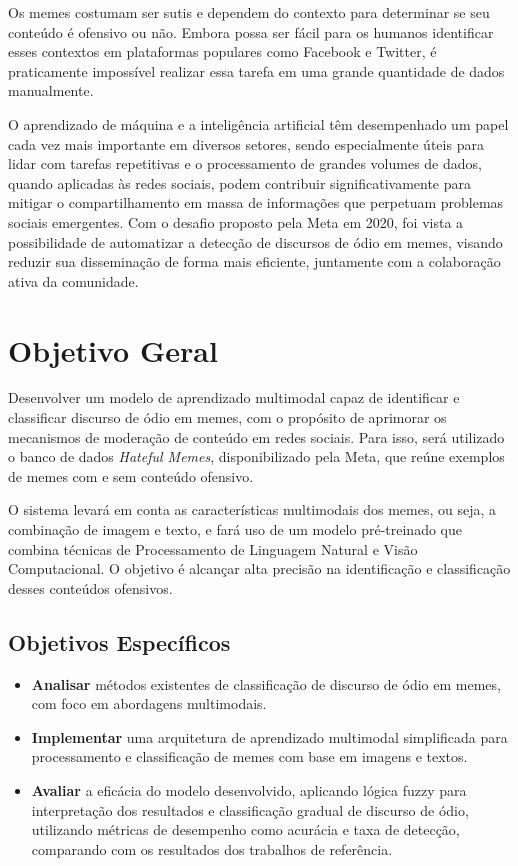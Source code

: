 Os memes costumam ser sutis e dependem do contexto para determinar se seu conteúdo é ofensivo ou não. Embora possa ser fácil para os humanos identificar esses contextos em plataformas populares como Facebook e Twitter, é praticamente impossível realizar essa tarefa em uma grande quantidade de dados manualmente. 

O aprendizado de máquina e a inteligência artificial têm desempenhado um papel cada vez mais importante em diversos setores, sendo especialmente úteis para lidar com tarefas repetitivas e o processamento de grandes volumes de dados, quando aplicadas às redes sociais, podem contribuir significativamente para mitigar o compartilhamento em massa de informações que perpetuam problemas sociais emergentes. Com o desafio proposto pela Meta em 2020, foi vista a possibilidade de automatizar a detecção de discursos de ódio em memes, visando reduzir sua disseminação de forma mais eficiente, juntamente com a colaboração ativa da comunidade.


\section{Objetivo Geral}

Desenvolver um modelo de aprendizado multimodal capaz de identificar e classificar discurso de ódio em memes, com o propósito de aprimorar os mecanismos de moderação de conteúdo em redes sociais. Para isso, será utilizado o banco de dados \textit{Hateful Memes}, disponibilizado pela Meta, que reúne exemplos de memes com e sem conteúdo ofensivo.

O sistema levará em conta as características multimodais dos memes, ou seja, a combinação de imagem e texto, e fará uso de um modelo pré-treinado que combina técnicas de Processamento de Linguagem Natural e Visão Computacional. O objetivo é alcançar alta precisão na identificação e classificação desses conteúdos ofensivos.

\subsection{Objetivos Específicos}

\begin{itemize}
    \item \textbf{Analisar} métodos existentes de classificação de discurso de ódio em memes, com foco em abordagens multimodais.
    \item \textbf{Implementar} uma arquitetura de aprendizado multimodal simplificada para processamento e classificação de memes com base em imagens e textos.
    \item \textbf{Avaliar} a eficácia do modelo desenvolvido, aplicando lógica fuzzy para interpretação dos resultados e classificação gradual de discurso de ódio, utilizando métricas de desempenho como acurácia e taxa de detecção, comparando com os resultados dos trabalhos de referência.
\end{itemize}